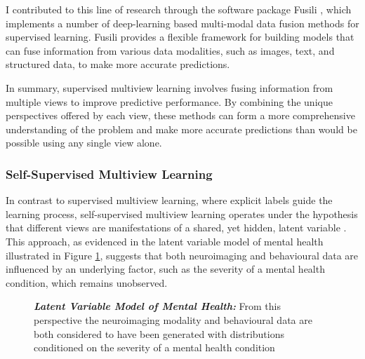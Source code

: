 I contributed to this line of research through the software package Fusili \citep{florence_townend_2023_10228564}, which implements a number of deep-learning based multi-modal data fusion methods for supervised learning. Fusili provides a flexible framework for building models that can fuse information from various data modalities, such as images, text, and structured data, to make more accurate predictions.

In summary, supervised multiview learning involves fusing information from multiple \gls{views} to improve predictive performance. By combining the unique perspectives offered by each view, these methods can form a more comprehensive understanding of the problem and make more accurate predictions than would be possible using any single view alone.

\subsubsection{Self-Supervised Multiview Learning}

In contrast to supervised multiview learning, where explicit labels guide the learning process, self-supervised multiview learning operates under the hypothesis that different \gls{views} are manifestations of a shared, yet hidden, latent variable \citep{zong2023self}.
This approach, as evidenced in the latent variable model of mental health illustrated in Figure \ref{fig:mentalhealthselfsupervised}, suggests that both neuroimaging and behavioural data are influenced by an underlying factor, such as the severity of a mental health condition, which remains unobserved.

\begin{figure}
    \centering
    \caption[Latent Variable Model of Mental Health]{\textit{\textbf{Latent Variable Model of Mental Health:}} From this perspective the neuroimaging modality and behavioural data are both considered to have been generated with distributions conditioned on the severity of a mental health condition}\label{fig:mentalhealthselfsupervised}
\end{figure}

